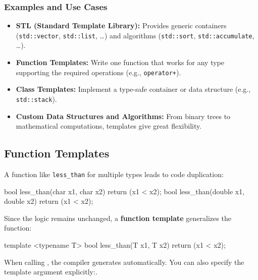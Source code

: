 \subsubsection{Examples and Use Cases}
\begin{itemize}
    \item \textbf{STL (Standard Template Library):} Provides generic containers (\texttt{std::vector}, \texttt{std::list}, \dots) and algorithms (\texttt{std::sort}, \texttt{std::accumulate}, \dots).
    \item \textbf{Function Templates:} Write one function that works for any type supporting the required operations (e.g., \texttt{operator+}).
    \item \textbf{Class Templates:} Implement a type-safe container or data structure (e.g., \texttt{std::stack}).
    \item \textbf{Custom Data Structures and Algorithms:} From binary trees to mathematical computations, templates give great flexibility.
\end{itemize}


\subsection{Function Templates}

\begin{exampleblock}
A function like \texttt{less\_than} for multiple types leads to code duplication:

\begin{codeblock}[language=C++]
bool less_than(char x1, char x2) { return (x1 < x2); }
bool less_than(double x1, double x2) { return (x1 < x2); }
\end{codeblock}

Since the logic remains unchanged, a \textbf{function template} generalizes the function:

\begin{codeblock}[language=C++]
template <typename T>
bool less_than(T x1, T x2) { return (x1 < x2); }
\end{codeblock}

When calling , the compiler generates  automatically. You can also specify the template argument explicitly:\newline{}.

\end{exampleblock}


